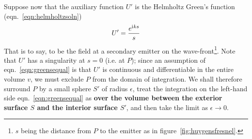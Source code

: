 Suppose now that the auxiliary function \(U'\) is the Helmholtz Green's function (eqn.~\eqref{eqn:helmholtzsoln})
%
\begin{equation}
    U' = \frac{e^{\mathrm{i}\mkern1mu k s}}{s}
\end{equation}
%
That is to say, to be the field at a secondary emitter on the wave-front\footnote{\(s\) being the distance from \(P\) to the emitter as in figure~\ref{fig:huygensfresnel}.}.
%
Note that \(U'\) has a singularity at \(s = 0\) (i.e. at \(P\)); since an assumption of eqn.~\eqref{eqn:greensequal} is that \(U'\) is continuous and differentiable in the entire volume \(v\), we must exclude \(P\) from the domain of integration.
%
We shall therefore surround \(P\) by a small sphere \(S'\) of radius \(\epsilon\), treat the integration on the left-hand side eqn.~\eqref{eqn:greensequal} as \textbf{over the volume between the exterior surface \(S\) and the interior surface \(S'\)}, and then take the limit as \(\epsilon \rightarrow 0\).

